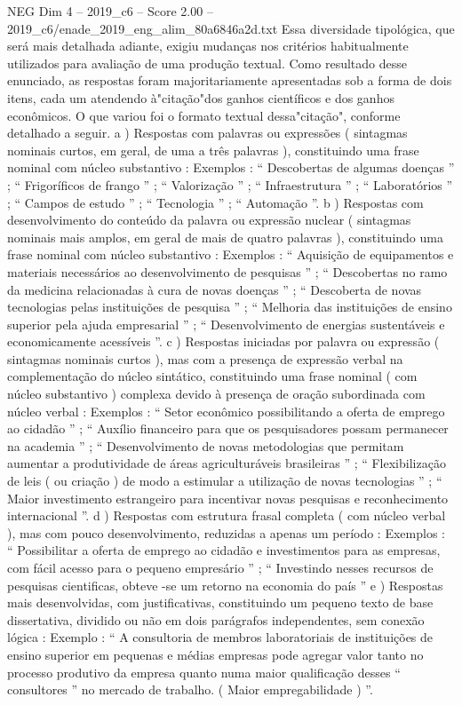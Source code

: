 \begin{textsample}{NEG Dim 4 – 2019\_c6 – Score 2.00 – 2019\_c6/enade\_2019\_eng\_alim\_80a6846a2d.txt}
Essa diversidade tipológica, que será mais detalhada adiante, exigiu mudanças nos critérios habitualmente utilizados para avaliação de uma produção textual.
Como resultado desse enunciado, as respostas foram majoritariamente apresentadas sob a forma de dois itens, cada um atendendo à"citação"dos ganhos científicos e dos ganhos econômicos.
O que variou foi o formato textual dessa"citação", conforme detalhado a seguir. a ) Respostas com palavras ou expressões ( sintagmas nominais curtos, em geral, de uma a três palavras ), constituindo uma frase nominal com núcleo substantivo : Exemplos : “ Descobertas de algumas doenças ” ; “ Frigoríficos de frango ” ; “ Valorização ” ; “ Infraestrutura ” ; “ Laboratórios ” ; “ Campos de estudo ” ; “ Tecnologia ” ; “ Automação ”. b ) Respostas com desenvolvimento do conteúdo da palavra ou expressão nuclear ( sintagmas nominais mais amplos, em geral de mais de quatro palavras ), constituindo uma frase nominal com núcleo substantivo : Exemplos : “ Aquisição de equipamentos e materiais necessários ao desenvolvimento de pesquisas ” ; “ Descobertas no ramo da medicina relacionadas à cura de novas doenças ” ; “ Descoberta de novas tecnologias pelas instituições de pesquisa ” ; “ Melhoria das instituições de ensino superior pela ajuda empresarial ” ; “ Desenvolvimento de energias sustentáveis e economicamente acessíveis ”. c ) Respostas iniciadas por palavra ou expressão ( sintagmas nominais curtos ), mas com a presença de expressão verbal na complementação do núcleo sintático, constituindo uma frase nominal ( com núcleo substantivo ) complexa devido à presença de oração subordinada com núcleo verbal : Exemplos : “ Setor econômico possibilitando a oferta de emprego ao cidadão ” ; “ Auxílio financeiro para que os pesquisadores possam permanecer na academia ” ; “ Desenvolvimento de novas metodologias que permitam aumentar a produtividade de áreas agriculturáveis brasileiras ” ; “ Flexibilização de leis ( ou criação ) de modo a estimular a utilização de novas tecnologias ” ; “ Maior investimento estrangeiro para incentivar novas pesquisas e reconhecimento internacional ”. d ) Respostas com estrutura frasal completa ( com núcleo verbal ), mas com pouco desenvolvimento, reduzidas a apenas um período : Exemplos : “ Possibilitar a oferta de emprego ao cidadão e investimentos para as empresas, com fácil acesso para o pequeno empresário ” ; “ Investindo nesses recursos de pesquisas cientificas, obteve -se um retorno na economia do país ” e ) Respostas mais desenvolvidas, com justificativas, constituindo um pequeno texto de base dissertativa, dividido ou não em dois parágrafos independentes, sem conexão lógica : Exemplo : “ A consultoria de membros laboratoriais de instituições de ensino superior em pequenas e médias empresas pode agregar valor tanto no processo produtivo da empresa quanto numa maior qualificação desses “ consultores ” no mercado de trabalho. ( Maior empregabilidade ) ”.

\end{textsample}
